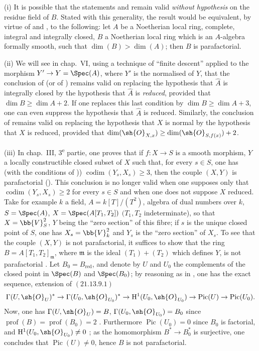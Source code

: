 \begin{remark}[21.14.4]
\label{IV.21.14.4}
(i) It is possible that the statements  and  remain valid \emph{without hypothesis} on the residue field of $B$.
Stated with this generality, the result would be equivalent, by virtue of  and , to the following: let $A$ be a Noetherian local ring, complete, integral and integrally closed, $B$ a Noetherian local ring which is an $A$-algebra formally smooth, such that $\dim(B)>\dim(A)$; then $B$ is parafactorial.

(ii) We will see in chap.~VI, using a technique of ``finite descent'' applied to the morphism $Y'\to Y=\Spec(A)$, where $Y'$ is the normalised of $Y$, that the conclusion of  (or of ) remains valid on replacing the hypothesis that $\hat{A}$ is integrally closed by the hypothesis that $\hat{A}$ is \emph{reduced}, provided that $\dim B\geq\dim A+2$.
If one replaces this last condition by $\dim B\geq\dim A+3$, one can even suppress the hypothesis that $\hat{A}$ is reduced.
Similarly, the conclusion of  remains valid on replacing the hypothesis that $X$ is normal by the hypothesis that $X$ is reduced, provided that $\dim(\sh{O}_{X,x})\geq\dim(\sh{O}_{S,f(x)})+2$.

(iii) In chap.~III, 3\textsuperscript{e} partie, one proves that if $f:X\to S$ is a smooth morphism, $Y$ a locally constructible closed subset of $X$ such that, for every $s\in S$, one has (with the conditions of )) $\operatorname{codim}(Y_s,X_s)\geq 3$, then the couple $(X,Y)$ is parafactorial (\cite[XII, 4.8]{41}).
This conclusion is no longer valid when one supposes only that $\operatorname{codim}(Y_s,X_s)\geq 2$ for every $s\in S$ and when one does not suppose $X$ reduced.
Take for example $k$ a field, $A=k[T]/(T^2)$, algebra of dual numbers over $k$, $S=\Spec(A)$, $X=\Spec(A[T_1,T_2])$ $(T_1,T_2$ indeterminate), so that $X=\bb{V}_S^2$, $Y$ being the ``zero section'' of this fibre; if $s$ is the unique closed point of $S$, one has $X_s=\bb{V}_k^2$ and $Y_s$ is the ``zero section'' of $X_s$.
To see that the couple $(X,Y)$ is not parafactorial, it suffices to show that the ring $B=A[T_1,T_2]_\mathfrak{m}$, where $\mathfrak{m}$ is the ideal $(T_1)+(T_2)$ which defines $Y$, is not parafactorial .
Let $B_0=B_{\mathrm{red}}$, and denote by $U$ and $U_0$ the complements of the closed point in $\Spec(B)$ and $\Spec(B_0)$; by reasoning as in , one has the exact sequence, extension of $(21.13.9.1)$
\[
  \Gamma(U,\sh{O}_U)^*\to\Gamma(U_0,\sh{O}_{U_0})^*\to\mathrm{H}^1(U_0,\sh{O}_{U_0})\to\operatorname{Pic}(U)\to\operatorname{Pic}(U_0).
\]
Now, one has $\Gamma(U,\sh{O}_U)=B$, $\Gamma(U_0,\sh{O}_{U_0})=B_0$ since $\operatorname{prof}(B)=\operatorname{prof}(B_0)=2$ .
Furthermore $\operatorname{Pic}(U_0)=0$ since $B_0$ is factorial, and $\mathrm{H}^1(U_0,\sh{O}_{U_0})\neq 0$ \cite[3, Exemple~III-1]{41}; as the homomorphism $B^*\to B_0^*$ is surjective, one concludes that $\operatorname{Pic}(U)\neq 0$, hence $B$ is not parafactorial.
\end{remark}
